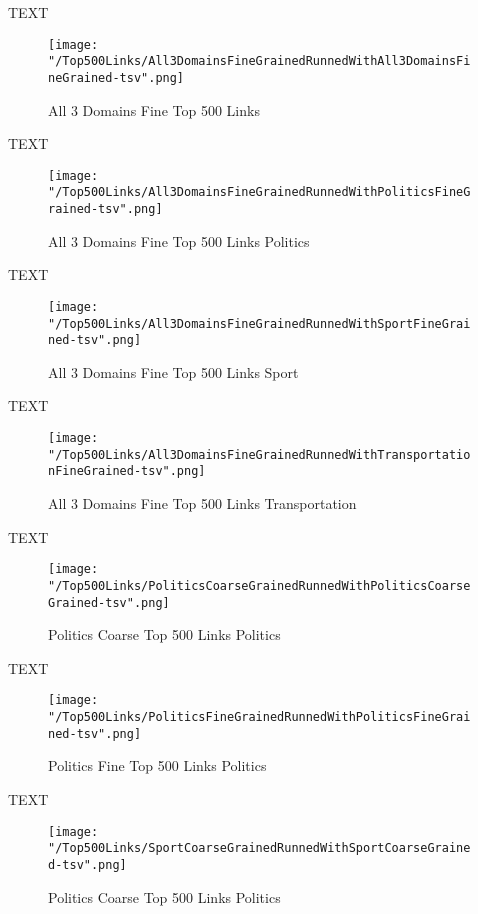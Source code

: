 \documentclass[thesis=M,english]{FITthesis}[2018/05/30]
\begin{document}
		TEXT	

	\begin{figure}\centering
		\texttt{[image: "/Top500Links/All3DomainsFineGrainedRunnedWithAll3DomainsFineGrained-tsv".png]}
		\caption{All 3 Domains Fine Top 500 Links }\label{}	
	\end{figure}
	
	TEXT

	\begin{figure}\centering
		\texttt{[image: "/Top500Links/All3DomainsFineGrainedRunnedWithPoliticsFineGrained-tsv".png]}
		\caption{All 3 Domains Fine Top 500 Links Politics}\label{}
	\end{figure}	

	TEXT	

	\begin{figure}\centering
		\texttt{[image: "/Top500Links/All3DomainsFineGrainedRunnedWithSportFineGrained-tsv".png]}
		\caption{All 3 Domains Fine Top 500 Links Sport}\label{}
	\end{figure}
	
		TEXT	

	\begin{figure}\centering
		\texttt{[image: "/Top500Links/All3DomainsFineGrainedRunnedWithTransportationFineGrained-tsv".png]}
		\caption{All 3 Domains Fine Top 500 Links Transportation}\label{}	
	\end{figure}
	
	TEXT

	\begin{figure}\centering
		\texttt{[image: "/Top500Links/PoliticsCoarseGrainedRunnedWithPoliticsCoarseGrained-tsv".png]}
		\caption{Politics Coarse Top 500 Links Politics}\label{}
	\end{figure}	

	TEXT	

	\begin{figure}\centering
		\texttt{[image: "/Top500Links/PoliticsFineGrainedRunnedWithPoliticsFineGrained-tsv".png]}
		\caption{Politics Fine Top 500 Links Politics}\label{}
	\end{figure}

	
	TEXT

	\begin{figure}\centering
		\texttt{[image: "/Top500Links/SportCoarseGrainedRunnedWithSportCoarseGrained-tsv".png]}
		\caption{Politics Coarse Top 500 Links Politics}\label{}
	\end{figure}		
	
\end{document}
